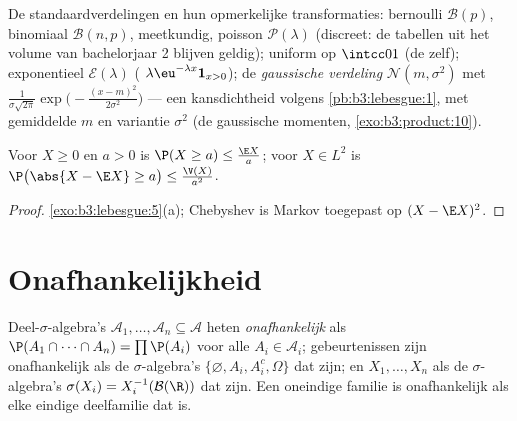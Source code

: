 \begin{example}\label{ex:b3:probability:laws}
De standaardverdelingen en hun opmerkelijke transformaties:
bernoulli $\mathcal B(p)$, binomiaal $\mathcal B(n, p)$,
meetkundig, poisson $\mathcal P(\lambda)$ (discreet: de tabellen
uit het volume van bachelorjaar 2 blijven geldig); uniform op
$\intcc01$ (de  zelf); exponentieel $\mathcal
E(\lambda)$ ( $\lambda\eu^{-\lambda x}\mathbf
1_{x>0}$); de \emph{gaussische verdeling} $\mathcal N(m, \sigma^2)$ met 
$\frac1{\sigma\sqrt{2\pi}}\exp\bigl(-\frac{(x -
m)^2}{2\sigma^2}\bigr)$ --- een kansdichtheid volgens
\cref{pb:b3:lebesgue:1}, met gemiddelde $m$ en variantie
$\sigma^2$ (de gaussische momenten,
\cref{exo:b3:product:10}).
\end{example}

\begin{proposition}
\label{prop:b3:probability:markov}
Voor $X \geq 0$ en $a > 0$ is $\P(X \geq a) \leq \frac{\E X}{a}$;
voor $X \in L^2$ is $\P\bigl(\abs{X - \E X} \geq a\bigr) \leq
\frac{\V(X)}{a^2}$.
\end{proposition}

\begin{proof}
\cref{exo:b3:lebesgue:5}(a); Chebyshev is Markov toegepast op $(X
- \E X)^2$.
\end{proof}

\section{Onafhankelijkheid}

\begin{definition}\label{def:b3:probability:independence}
Deel-$\sigma$-algebra's $\mathcal A_1, \dots, \mathcal A_n
\subseteq \mathcal A$ heten
\emph{onafhankelijk} als
$\P(A_1\cap\dots\cap A_n) = \prod\P(A_i)$ voor alle $A_i \in
\mathcal A_i$; gebeurtenissen zijn onafhankelijk als de
$\sigma$-algebra's $\{\varnothing, A_i, A_i^c, \Omega\}$ dat
zijn; en  $X_1, \dots, X_n$ als de
$\sigma$-algebra's $\sigma(X_i) = X_i^{-1}(\mathcal B(\R))$ dat
zijn. Een oneindige familie is onafhankelijk als elke eindige
deelfamilie dat is.
\end{definition}

